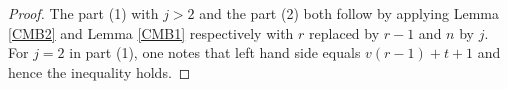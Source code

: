\documentclass[11pt, reqno]{amsart}
\numberwithin{equation}{section}
\newtheorem{lemma}[thm]{Lemma}
\theoremstyle{definition}
\theoremstyle{remark}
\newtheorem{remark}[thm]{Remark}
\theoremstyle{definition}
\theoremstyle{remark}
\theoremstyle{remark}
\begin{document}
\begin{proof}

    The part (1) with $j>2$ and the part (2) both follow by applying Lemma \ref{CMB2} and Lemma \ref{CMB1} respectively with $r$ replaced by $r-1$ and $n$ by $j$. For $j=2$ in part (1), one notes that left hand side equals $v(r-1)+t+1$ and hence the inequality holds.
\end{proof}
\end{document}
